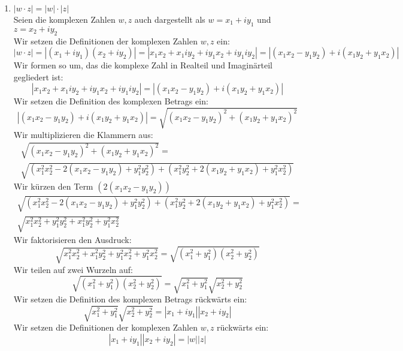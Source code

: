\documentclass{article}
\begin{document}
\begin{enumerate}[ label = (\alph*) ]
\begin{enumerate}
            \item \( |w \cdot z| = |w| \cdot |z| \) \\
            Seien die komplexen Zahlen \(w, z\) auch dargestellt als \(w = x_1 + iy_1 \) und \(z = x_2 + iy_2 \) \\
            Wir setzen die Definitionen der komplexen Zahlen \(w, z\) ein:
            \[ |w \cdot z| = | (x_1 + iy_1) (x_2 + iy_2) | = | x_1 x_2 + x_1 i y_2 + iy_1 x_2 + iy_1 iy_2 |  = | (x_1 x_2 - y_1 y_2) + i( x_1 y_2 +  y_1 x_2) | \]
            Wir formen so um, das die komplexe Zahl in Realteil und Imaginärteil gegliedert ist:
            \[ | x_1 x_2 + x_1 i y_2 + iy_1 x_2 + iy_1 iy_2 | = | (x_1 x_2 - y_1 y_2) + i( x_1 y_2 +  y_1 x_2) | \]
            Wir setzen die Definition des komplexen Betrags ein:
            \[ | (x_1 x_2 - y_1 y_2) + i( x_1 y_2 +  y_1 x_2) | = \sqrt{ {(x_1 x_2 - y_1 y_2)}^2 + {( x_1 y_2 +  y_1 x_2)}^2 } \]
            Wir multiplizieren die Klammern aus:
            \begin{gather*}
                \sqrt{ {(x_1 x_2 - y_1 y_2)}^2 + {( x_1 y_2 +  y_1 x_2)}^2 } = \\
                \sqrt{ (x_1^2 x_2^2 -2 (x_1 x_2 - y_1 y_2) + y_1^2 y_2^2 ) + (x_1^2 y_2^2 + 2( x_1 y_2 +  y_1 x_2) + y_1^2 x_2^2) } 
            \end{gather*}
            Wir kürzen den Term \( (2 (x_1 x_2 - y_1 y_2)) \)
            \begin{gather*}
                \sqrt{ (x_1^2 x_2^2 -2 (x_1 x_2 - y_1 y_2) + y_1^2 y_2^2 ) + (x_1^2 y_2^2 + 2( x_1 y_2 +  y_1 x_2) + y_1^2 x_2^2) } = \\
                \sqrt{ x_1^2 x_2^2 + y_1^2 y_2^2 + x_1^2 y_2^2 + y_1^2 x_2^2 }
            \end{gather*}
            Wir faktorisieren den Ausdruck:
            \[ \sqrt{ x_1^2 x_2^2 + x_1^2 y_2^2 + y_1^2 x_2^2 + y_1^2 x_2^2 } = \sqrt{ (x_1^2 + y_1^2)  (x_2^2 + y_2^2) } \]
            Wir teilen auf zwei Wurzeln auf:
            \[ \sqrt{ (x_1^2 + y_1^2)  (x_2^2 + y_2^2) } = \sqrt{ x_1^2 + y_1^2} \sqrt{ x_2^2 + y_2^2 } \]
            Wir setzen die Definition des komplexen Betrags rückwärts ein:
            \[ \sqrt{ x_1^2 + y_1^2 } \sqrt{ x_2^2 + y_2^2 } = |x_1 + iy_1| | x_2 + iy_2| \]
            Wir setzen die Definitionen der komplexen Zahlen \(w, z\) rückwärts ein:
            \[ |x_1 + iy_1| | x_2 + iy_2| = |w| |z| \]


\end{enumerate}
\end{enumerate}
\end{document}
